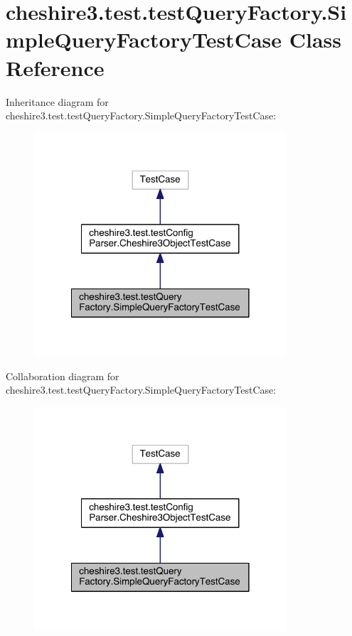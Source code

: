 \hypertarget{classcheshire3_1_1test_1_1test_query_factory_1_1_simple_query_factory_test_case}{\section{cheshire3.\-test.\-test\-Query\-Factory.\-Simple\-Query\-Factory\-Test\-Case Class Reference}
\label{classcheshire3_1_1test_1_1test_query_factory_1_1_simple_query_factory_test_case}
}


Inheritance diagram for cheshire3.\-test.\-test\-Query\-Factory.\-Simple\-Query\-Factory\-Test\-Case\-:
\nopagebreak
\begin{figure}[H]
\begin{center}
\leavevmode
\includegraphics[width=266pt]{classcheshire3_1_1test_1_1test_query_factory_1_1_simple_query_factory_test_case__inherit__graph}
\end{center}
\end{figure}


Collaboration diagram for cheshire3.\-test.\-test\-Query\-Factory.\-Simple\-Query\-Factory\-Test\-Case\-:
\nopagebreak
\begin{figure}[H]
\begin{center}
\leavevmode
\includegraphics[width=266pt]{classcheshire3_1_1test_1_1test_query_factory_1_1_simple_query_factory_test_case__coll__graph}
\end{center}
\end{figure}
